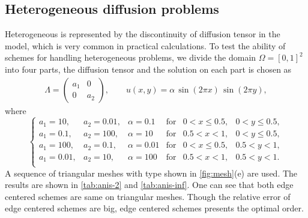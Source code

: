 \documentclass[times,review,preprint,authoryear]{elsarticle}
\begin{document}
\subsection{Heterogeneous diffusion problems}

Heterogeneous is represented by the discontinuity of diffusion tensor  in the model, which is very common in practical calculations. To test the ability of schemes for handling heterogeneous problems, we divide the domain $\Omega = [0,1]^2$ into four parts, the diffusion tensor and the solution on each part is chosen as
\begin{align*}
\Lambda =
\left(
\begin{matrix}
a_1 & 0 \\
0 & a_2
\end{matrix}
\right),
\qquad
u(x,y) = \alpha \, \sin(2 \pi x) \, \sin(2 \pi y),
\end{align*}
where
\begin{equation*}
\left\{
\begin{array}{llllll}
a_1 = 10, & a_2 = 0.01, & \alpha = 0.1 & \text{for} & 0 < x \leq 0.5, & 0 < y \leq 0.5, \\
a_1 = 0.1, & a_2 = 100, & \alpha = 10 & \text{for} & 0.5 < x < 1, & 0 < y \leq 0.5, \\
a_1 = 100, & a_2 = 0.1, & \alpha = 0.01 & \text{for} & 0 < x \leq 0.5, & 0.5 < y < 1, \\
a_1 = 0.01, & a_2 = 10, & \alpha = 100 & \text{for} & 0.5 < x < 1, & 0.5 < y < 1. \\
\end{array}
\right.
\end{equation*}
A sequence of triangular meshes with type shown in \cref{fig:mesh}(e) are used. The results are shown in \cref{tab:anis-2} and \cref{tab:anis-inf}. One can see that both edge centered schemes are same on triangular meshes. Though the relative error of edge centered schemes are big, edge centered schemes presents the optimal order.
\end{document}
